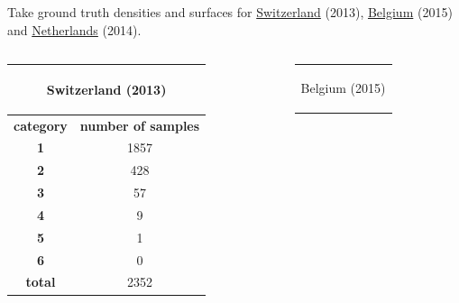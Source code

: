 \documentclass[c]{beamer}
\begin{document}
\begin{frame}
\begin{itemize}
{\scriptsize
 \item Take ground truth densities and surfaces for \href{https://www.bfs.admin.ch/bfs/fr/home/statistiques/population/effectif-evolution/population.assetdetail.1401563.html}{Switzerland} (2013),
  \href{https://fr.wikipedia.org/wiki/Liste_des_communes_de_Belgique_par_population}{Belgium} (2015)  and \href{https://www.citypopulation.de/php/netherlands-admin.php}{Netherlands} (2014).
 \begin{columns}
  \begin{column}{0.33\textwidth}
   \begin{table}
   \begin{center}
   \begin{adjustbox}{max width=0.5\textwidth}
    \begin{tabular}{|c|c|}
      \hline
      \multicolumn{2}{|c|}{\begin{bf}Switzerland (2013)\end{bf}} \\
      \hline
      \textbf{category} & \textbf{number of samples}\\
      \hline
      \textbf{1} & 1857\\
      \hline
      \textbf{2} & 428\\
      \hline
      \textbf{3} & 57\\
      \hline
      \textbf{4} & 9\\
      \hline
      \textbf{5} & 1\\
      \hline
      \textbf{6} & 0 \\
      \hline
      \textbf{total} & 2352\\
      \hline
    \end{tabular}
   \end{adjustbox}
   \end{center}
   \end{table}
  \end{column}
  \begin{column}{0.33\textwidth}
   \begin{table}
   \begin{center}
   \begin{adjustbox}{max width=0.5\textwidth}
    \begin{tabular}{|c|c|}
      \hline
      \multicolumn{2}{|c|}{\begin{bf}Belgium (2015)\end{bf}} \\

\end{tabular}
\end{adjustbox}
\end{center}
\end{table}
\end{column}
\end{columns}}
\end{itemize}
\end{frame}
\end{document}
